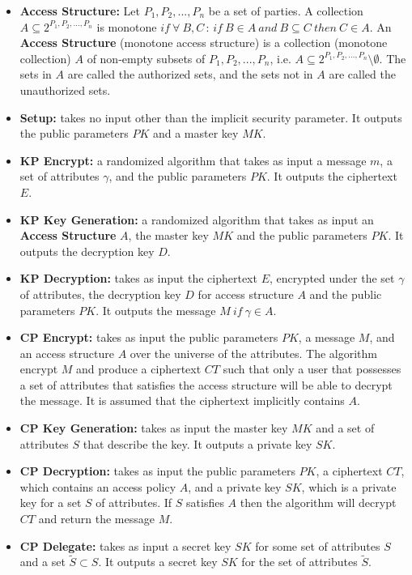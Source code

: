 \begin{itemize}
    \item \textbf{Access Structure:} Let ${P_1, P_2, ..., P_n}$ be a set of parties. A collection $A \subseteq 2^{P_1, P_2, ..., P_n}$ is monotone $if\ \forall\ B,C\, :\, if\ B \in A\ and\ B \subseteq C\ then\ C \in A$. An \textbf{Access Structure} (monotone access structure) is a collection (monotone collection) $A$ of non-empty subsets of ${P_1, P_2, ..., P_n}$, i.e. $A \subseteq 2^{P_1, P_2, ..., P_n} \setminus {\emptyset}$. The sets in $A$ are called the authorized sets, and the sets not in $A$ are called the unauthorized sets.
    \item \textbf{Setup:} takes no input other than the implicit security parameter. It outputs the public parameters $PK$ and a master key $MK$.
    \item \textbf{KP Encrypt:} a randomized algorithm that takes as input a message $m$, a set of attributes $\gamma$, and the public parameters $PK$. It outputs the ciphertext $E$.
    \item \textbf{KP Key Generation:} a randomized algorithm that takes as input an \textbf{Access Structure} $A$, the master key $MK$ and the public parameters $PK$. It outputs the decryption key $D$.
    \item \textbf{KP Decryption:} takes as input the ciphertext $E$, encrypted under the set $\gamma$ of attributes, the decryption key $D$ for access structure $A$ and the public parameters $PK$. It outputs the message $M\ if\ \gamma \in A$.
    \item \textbf{CP Encrypt:} takes as input the public parameters $PK$, a message $M$, and an access structure $A$ over the universe of the attributes. The algorithm encrypt $M$ and produce a ciphertext $CT$ such that only a user that possesses a set of attributes that satisfies the access structure will be able to decrypt the message. It is assumed that the ciphertext implicitly contains $A$.
    \item \textbf{CP Key Generation:} takes as input the master key $MK$ and a set of attributes $S$ that describe the key. It outputs a private key $SK$.
    \item \textbf{CP Decryption:} takes as input the public parameters $PK$, a ciphertext $CT$, which contains an access policy $A$, and a private key $SK$, which is a private key for a set $S$ of attributes. If $S$ satisfies $A$ then the algorithm will decrypt $CT$ and return the message $M$.
    \item \textbf{CP Delegate:} takes as input a secret key $SK$ for some set of attributes $S$ and a set $\tilde{S} \subset S$. It outputs a secret key $SK$ for the set of attributes $\tilde{S}$. 
\end{itemize}
